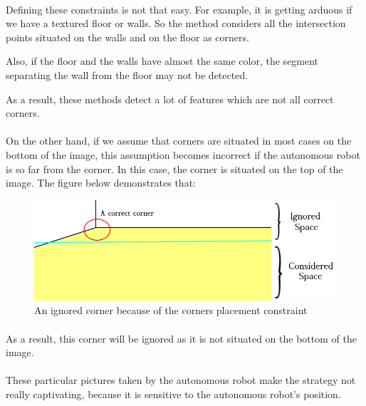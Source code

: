 \documentclass[12pt]{report}
\begin{document}
	 \paragraph{}
	 Defining these constraints is not that easy. For example, it is getting arduous if we have a textured floor or walls. So the method considers all the intersection points situated on the walls and on the floor as corners. 
	
	 Also, if the floor and the walls have almost the same color, the segment separating the wall from the floor may not be detected.
	 
	 As a result, these methods detect a lot of features which are not all correct corners.
	 
	 \paragraph{}
	 On the other hand, if we assume that corners are situated in most cases on the bottom of the image, this assumption becomes incorrect if the autonomous robot is so far from the corner. In this case, the corner is situated on the top of the image. The figure below demonstrates that:
	 	\begin{figure}[H]
	 	\begin{center}
	 		\includegraphics[scale=0.6]{res/start1_c1.png}
	 		\caption{An ignored corner because of the corners placement constraint}
	 	\end{center}
	 \end{figure}
	 \paragraph{}
	 As a result, this corner will be ignored as it is not situated on the bottom of the image.
	 
	 \paragraph{}
	 These particular pictures taken by the autonomous robot make the strategy not really captivating, because it is sensitive to the autonomous robot's position.
	 
\end{document}
